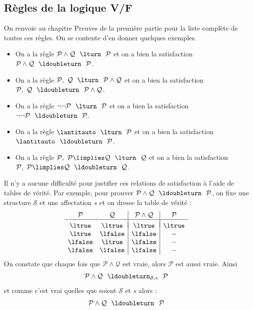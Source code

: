 \documentclass[11pt,class=report,crop=false]{standalone}
\begin{document}
\subsection{Règles de la logique V/F}


On renvoie au chapitre \og{}Preuves\fg{} de la première partie pour la liste complète de toutes ces règles.
On se contente d'en donner quelques exemples.
\begin{itemize}
	\item On a la règle \og{}$\mathcal{P} \land \mathcal{Q} \ \ \lturn \ \ \mathcal{P}$\fg{}
	et on a bien la satisfaction \og{}$\mathcal{P} \land \mathcal{Q} \ \ \ldoubleturn \ \ \mathcal{P}$\fg{}.
	
	\item On a la règle \og{}$\mathcal{P}, \ \mathcal{Q} \ \ \lturn \ \ \mathcal{P} \land \mathcal{Q}$\fg{}
	et on a bien la satisfaction \og{}$\mathcal{P}, \ \mathcal{Q} \ \ \ldoubleturn \ \ \mathcal{P} \land \mathcal{Q}$\fg{}.
	
	\item On a la règle \og{}$\lnot \lnot \mathcal{P} \ \ \lturn \ \ \mathcal{P}$\fg{}
	et on a bien la satisfaction \og{}$\lnot \lnot \mathcal{P} \ \ \ldoubleturn \ \ \mathcal{P}$\fg{}.
	
	\item On a la règle \og{}$\lantitauto \ \ \lturn \ \ \mathcal{P}$\fg{} 
	et on a bien la satisfaction \og{}$\lantitauto \ \ \ldoubleturn \ \ \mathcal{P}$\fg{}.	
	
	\item On a la règle \og{}$\mathcal{P}, \ \mathcal{P} \limplies \mathcal{Q} \ \ \lturn \ \ \mathcal{Q}$\fg{}
	et on a bien la satisfaction \og{}$\mathcal{P}, \ \mathcal{P} \limplies \mathcal{Q} \ \ \ldoubleturn \ \ \mathcal{Q}$\fg{}.	
\end{itemize}

\medskip
Il n'y a aucune difficulté pour justifier ces relations de satisfaction  à l'aide de tables de vérité.
Par exemple, pour prouver $\mathcal{P} \land \mathcal{Q} \ \ \ldoubleturn \ \ \mathcal{P}$, on fixe une structure $\mathcal{S}$ et une affectation $s$ et on dresse la table de vérité :
\[
\begin{array}{c c | c | c}
	\mathcal{P}		& \mathcal{Q} 		& \mathcal{P} \land \mathcal{Q} 	&  \mathcal{P} \\
	\hline
	&&&	\\[-2ex]
	\ltrue 	& \ltrue 	& \ltrue		& \ltrue \\
	\ltrue 	& \lfalse 	& \lfalse		& - \\
	\lfalse & \ltrue 	& \lfalse		& - \\	
	\lfalse & \lfalse 	& \lfalse		& - \\		
\end{array}
\]
On constate que chaque fois que $\mathcal{P} \land \mathcal{Q}$ est vraie, alors $\mathcal{P}$ est aussi vraie. Ainsi 
\[
\mathcal{P} \land \mathcal{Q} \ \ \ldoubleturn_{\mathcal{S},s} \ \ \mathcal{P}
\] 
et comme c'est vrai quelles que soient $\mathcal{S}$ et $s$ alors :
\[
\mathcal{P} \land \mathcal{Q} \ \ \ldoubleturn \ \ \mathcal{P}
\]
\end{document}
